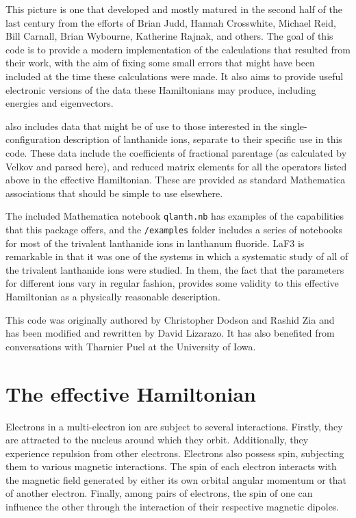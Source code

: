 \documentclass{article}
\newcommand{\codetext}[1]{{\color{BlueViolet} \texttt{#1}}}
\begin{document}
This picture is one that developed and mostly matured in the second half of the last century from the efforts of Brian Judd, Hannah Crosswhite, Michael Reid, Bill Carnall, Brian Wybourne, Katherine Rajnak, and others. The goal of this code is to provide a modern implementation of the calculations that resulted from their work, with the aim of fixing some small errors that might have been included at the time these calculations were made. It also aims to provide useful electronic versions of the data these Hamiltonians may produce, including energies and eigenvectors.

\qlanth also includes data that might be of use to those interested in the single-configuration description of lanthanide ions, separate to their specific use in this code. These data include the coefficients of fractional parentage (as calculated by Velkov and parsed here), and reduced matrix elements for all the operators listed above in the effective Hamiltonian. These are provided as standard Mathematica associations that should be simple to use elsewhere.

The included Mathematica notebook \codetext{qlanth.nb} has examples of the capabilities that this package offers, and the \codetext{/examples} folder includes a series of notebooks for most of the trivalent lanthanide ions in lanthanum fluoride. LaF3 is remarkable in that it was one of the systems in which a systematic study \cite{carnall_systematic_1989} of all of the trivalent lanthanide ions were studied. In them, the fact that the parameters for different ions vary in regular fashion, provides some validity to this effective Hamiltonian as a physically reasonable description.

This code was originally authored by Christopher Dodson and Rashid Zia and has been modified and rewritten by David Lizarazo. It has also benefited from conversations with Tharnier Puel at the University of Iowa.

\section{The effective Hamiltonian} 

Electrons in a multi-electron ion are subject to several interactions. Firstly, they are attracted to the nucleus around which they orbit. Additionally, they experience repulsion from other electrons. Electrons also possess spin, subjecting them to various magnetic interactions. The spin of each electron interacts with the magnetic field generated by either its own orbital angular momentum or that of another electron. Finally, among pairs of electrons, the spin of one can influence the other through the interaction of their respective magnetic dipoles.
\end{document}
